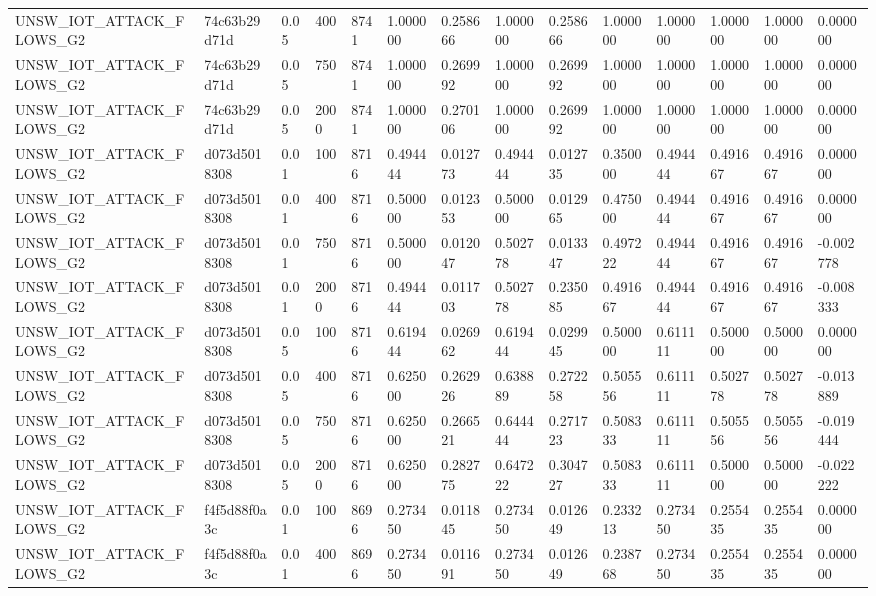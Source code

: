 \begin{tabular}{llllllllllllll}
UNSW\_IOT\_ATTACK\_FLOWS\_G2 & 74c63b29d71d & 0.05 & 400 & 8741 & 1.000000 & 0.258666 & 1.000000 & 0.258666 & 1.000000 & 1.000000 & 1.000000 & 1.000000 & 0.000000 \\
UNSW\_IOT\_ATTACK\_FLOWS\_G2 & 74c63b29d71d & 0.05 & 750 & 8741 & 1.000000 & 0.269992 & 1.000000 & 0.269992 & 1.000000 & 1.000000 & 1.000000 & 1.000000 & 0.000000 \\
UNSW\_IOT\_ATTACK\_FLOWS\_G2 & 74c63b29d71d & 0.05 & 2000 & 8741 & 1.000000 & 0.270106 & 1.000000 & 0.269992 & 1.000000 & 1.000000 & 1.000000 & 1.000000 & 0.000000 \\
UNSW\_IOT\_ATTACK\_FLOWS\_G2 & d073d5018308 & 0.01 & 100 & 8716 & 0.494444 & 0.012773 & 0.494444 & 0.012735 & 0.350000 & 0.494444 & 0.491667 & 0.491667 & 0.000000 \\
UNSW\_IOT\_ATTACK\_FLOWS\_G2 & d073d5018308 & 0.01 & 400 & 8716 & 0.500000 & 0.012353 & 0.500000 & 0.012965 & 0.475000 & 0.494444 & 0.491667 & 0.491667 & 0.000000 \\
UNSW\_IOT\_ATTACK\_FLOWS\_G2 & d073d5018308 & 0.01 & 750 & 8716 & 0.500000 & 0.012047 & 0.502778 & 0.013347 & 0.497222 & 0.494444 & 0.491667 & 0.491667 & -0.002778 \\
UNSW\_IOT\_ATTACK\_FLOWS\_G2 & d073d5018308 & 0.01 & 2000 & 8716 & 0.494444 & 0.011703 & 0.502778 & 0.235085 & 0.491667 & 0.494444 & 0.491667 & 0.491667 & -0.008333 \\
UNSW\_IOT\_ATTACK\_FLOWS\_G2 & d073d5018308 & 0.05 & 100 & 8716 & 0.619444 & 0.026962 & 0.619444 & 0.029945 & 0.500000 & 0.611111 & 0.500000 & 0.500000 & 0.000000 \\
UNSW\_IOT\_ATTACK\_FLOWS\_G2 & d073d5018308 & 0.05 & 400 & 8716 & 0.625000 & 0.262926 & 0.638889 & 0.272258 & 0.505556 & 0.611111 & 0.502778 & 0.502778 & -0.013889 \\
UNSW\_IOT\_ATTACK\_FLOWS\_G2 & d073d5018308 & 0.05 & 750 & 8716 & 0.625000 & 0.266521 & 0.644444 & 0.271723 & 0.508333 & 0.611111 & 0.505556 & 0.505556 & -0.019444 \\
UNSW\_IOT\_ATTACK\_FLOWS\_G2 & d073d5018308 & 0.05 & 2000 & 8716 & 0.625000 & 0.282775 & 0.647222 & 0.304727 & 0.508333 & 0.611111 & 0.500000 & 0.500000 & -0.022222 \\
UNSW\_IOT\_ATTACK\_FLOWS\_G2 & f4f5d88f0a3c & 0.01 & 100 & 8696 & 0.273450 & 0.011845 & 0.273450 & 0.012649 & 0.233213 & 0.273450 & 0.255435 & 0.255435 & 0.000000 \\
UNSW\_IOT\_ATTACK\_FLOWS\_G2 & f4f5d88f0a3c & 0.01 & 400 & 8696 & 0.273450 & 0.011691 & 0.273450 & 0.012649 & 0.238768 & 0.273450 & 0.255435 & 0.255435 & 0.000000 \\

\end{tabular}
